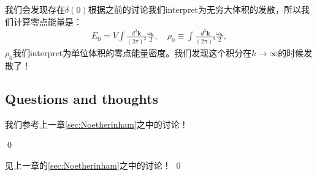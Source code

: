 \bigskip
{}

我们会发现存在$ \delta(0) $根据之前的讨论我们interpret为无穷大体积的发散，所以我们计算零点能量是：
\begin{align}
  E_0=V\int\frac{d^3\mathbf{k}}{(2\pi)^3}\frac{\omega_\mathbf{k}}{2},
  \quad
  \rho_0\equiv\int\frac{d^3\mathbf{k}}{(2\pi)^3}\frac{\omega_\mathbf{k}}{2},
\end{align}
$ \rho_0 $我们interpret为单位体积的零点能量密度。我们发现这个积分在$ k \to \infty $的时候发散了！

\subsection{Questions and thoughts}

我们参考上一章\cref{sec:Noetherinham}之中的讨论！

\qed

\bigskip
{}
见上一章的\cref{sec:Noetherinham}之中的讨论！
\qed
